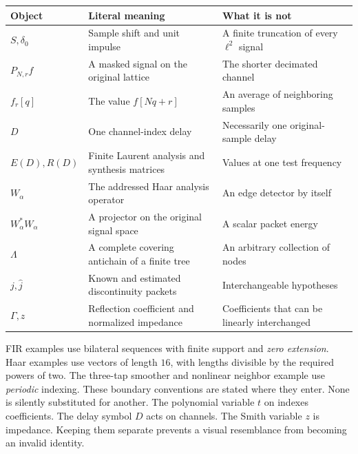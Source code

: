 \begin{tabularx}{\linewidth}{@{}p{.17\linewidth}YY@{}}\toprule
Object & Literal meaning & What it is not\\\midrule
$S,\delta_0$ & Sample shift and unit impulse & A finite truncation of every $\ell^2$ signal\\
$P_{N,r}f$ & A masked signal on the original lattice & The shorter decimated channel\\
$f_r[q]$ & The value $f[Nq+r]$ & An average of neighboring samples\\
$D$ & One channel-index delay & Necessarily one original-sample delay\\
$E(D),R(D)$ & Finite Laurent analysis and synthesis matrices & Values at one test frequency\\
$W_\alpha$ & The addressed Haar analysis operator & An edge detector by itself\\
$W_\alpha^*W_\alpha$ & A projector on the original signal space & A scalar packet energy\\
$\Lambda$ & A complete covering antichain of a finite tree & An arbitrary collection of nodes\\
$j,\widehat j$ & Known and estimated discontinuity packets & Interchangeable hypotheses\\
$\Gamma,z$ & Reflection coefficient and normalized impedance & Coefficients that can be linearly interchanged\\\bottomrule
\end{tabularx}
FIR examples use bilateral sequences with finite support and \emph{zero extension}. Haar examples use vectors of length $16$, with lengths divisible by the required powers of two. The three-tap smoother and nonlinear neighbor example use \emph{periodic} indexing. These boundary conventions are stated where they enter. None is silently substituted for another.
The polynomial variable $t$ on  indexes coefficients. The delay symbol $D$ acts on channels. The Smith variable $z$ is impedance. Keeping them separate prevents a visual resemblance from becoming an invalid identity.

